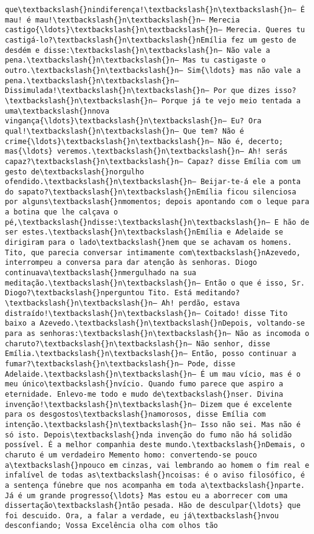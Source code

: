 \begin{Verbatim}[commandchars=\\\{\}]
que\textbackslash{}nindiferença!\textbackslash{}n\textbackslash{}n— É mau! é mau!\textbackslash{}n\textbackslash{}n— Merecia castigo{\ldots}\textbackslash{}n\textbackslash{}n— Merecia. Queres tu castigá-lo?\textbackslash{}n\textbackslash{}nEmília fez um gesto de desdém e disse:\textbackslash{}n\textbackslash{}n— Não vale a pena.\textbackslash{}n\textbackslash{}n— Mas tu castigaste o outro.\textbackslash{}n\textbackslash{}n— Sim{\ldots} mas não vale a pena.\textbackslash{}n\textbackslash{}n— Dissimulada!\textbackslash{}n\textbackslash{}n— Por que dizes isso?\textbackslash{}n\textbackslash{}n— Porque já te vejo meio tentada a uma\textbackslash{}nnova vingança{\ldots}\textbackslash{}n\textbackslash{}n— Eu? Ora qual!\textbackslash{}n\textbackslash{}n— Que tem? Não é crime{\ldots}\textbackslash{}n\textbackslash{}n— Não é, decerto; mas{\ldots} veremos.\textbackslash{}n\textbackslash{}n— Ah! serás capaz?\textbackslash{}n\textbackslash{}n— Capaz? disse Emília com um gesto de\textbackslash{}norgulho ofendido.\textbackslash{}n\textbackslash{}n— Beijar-te-á ele a ponta do sapato?\textbackslash{}n\textbackslash{}nEmília ficou silenciosa por alguns\textbackslash{}nmomentos; depois apontando com o leque para a botina que lhe calçava o pé,\textbackslash{}ndisse:\textbackslash{}n\textbackslash{}n— E hão de ser estes.\textbackslash{}n\textbackslash{}nEmília e Adelaide se dirigiram para o lado\textbackslash{}nem que se achavam os homens. Tito, que parecia conversar intimamente com\textbackslash{}nAzevedo, interrompeu a conversa para dar atenção às senhoras. Diogo continuava\textbackslash{}nmergulhado na sua meditação.\textbackslash{}n\textbackslash{}n— Então o que é isso, Sr. Diogo?\textbackslash{}nperguntou Tito. Está meditando?\textbackslash{}n\textbackslash{}n— Ah! perdão, estava distraído!\textbackslash{}n\textbackslash{}n— Coitado! disse Tito baixo a Azevedo.\textbackslash{}n\textbackslash{}nDepois, voltando-se para as senhoras:\textbackslash{}n\textbackslash{}n— Não as incomoda o charuto?\textbackslash{}n\textbackslash{}n— Não senhor, disse Emília.\textbackslash{}n\textbackslash{}n— Então, posso continuar a fumar?\textbackslash{}n\textbackslash{}n— Pode, disse Adelaide.\textbackslash{}n\textbackslash{}n— É um mau vício, mas é o meu único\textbackslash{}nvício. Quando fumo parece que aspiro a eternidade. Enlevo-me todo e mudo de\textbackslash{}nser. Divina invenção!\textbackslash{}n\textbackslash{}n— Dizem que é excelente para os desgostos\textbackslash{}namorosos, disse Emília com intenção.\textbackslash{}n\textbackslash{}n— Isso não sei. Mas não é só isto. Depois\textbackslash{}nda invenção do fumo não há solidão possível. É a melhor companhia deste mundo.\textbackslash{}nDemais, o charuto é um verdadeiro Memento homo: convertendo-se pouco a\textbackslash{}npouco em cinzas, vai lembrando ao homem o fim real e infalível de todas as\textbackslash{}ncoisas: é o aviso filosófico, é a sentença fúnebre que nos acompanha em toda a\textbackslash{}nparte. Já é um grande progresso{\ldots} Mas estou eu a aborrecer com uma dissertação\textbackslash{}ntão pesada. Hão de desculpar{\ldots} que foi descuido. Ora, a falar a verdade, eu já\textbackslash{}nvou desconfiando; Vossa Excelência olha com olhos tão 
\end{Verbatim}
